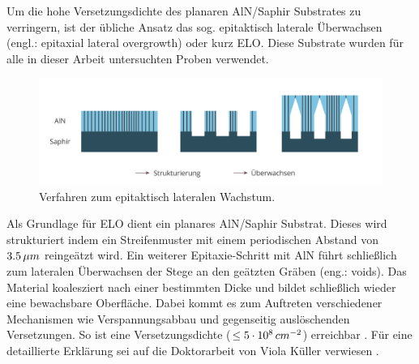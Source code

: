 Um die hohe Versetzungsdichte des planaren AlN/Saphir Substrates zu verringern, ist der übliche Ansatz das sog. epitaktisch laterale Überwachsen (engl.: epitaxial lateral overgrowth) oder kurz ELO. Diese Substrate wurden für alle in dieser Arbeit untersuchten Proben verwendet. 
\begin{figure}[h]
    \centering
    \begin{minipage}[t]{1\linewidth}
    \centering
    \includegraphics[width=1\linewidth]{Bilder/elostrukturierung.png}
    \end{minipage}%
    \caption{Verfahren zum epitaktisch lateralen Wachstum.}
     \label{fig:IQEthreadingdisl}
\end{figure}
\noindent
Als Grundlage für ELO dient ein planares AlN/Saphir Substrat. Dieses wird strukturiert indem ein Streifenmuster mit einem periodischen Abstand von $3.5 \thinspace \mu m$ reingeätzt wird. Ein weiterer Epitaxie-Schritt mit AlN führt schließlich zum lateralen Überwachsen der Stege an den geätzten Gräben (eng.: voids).
Das Material koalesziert nach einer bestimmten Dicke und bildet schließlich wieder eine bewachsbare Oberfläche. Dabei kommt es zum Auftreten verschiedener Mechanismen wie Verspannungsabbau und gegenseitig auslöschenden Versetzungen. So ist eine Versetzungsdichte ($\leq 5 \cdot 10^8 \thinspace cm^{-2}$) erreichbar \cite{zeimeru} \cite{MOGILATENKO2014222} \cite{vkueller} \cite{IMURA2007257}. Für eine detaillierte Erklärung sei auf die Doktorarbeit von Viola Küller verwiesen \cite{vkueller}.
